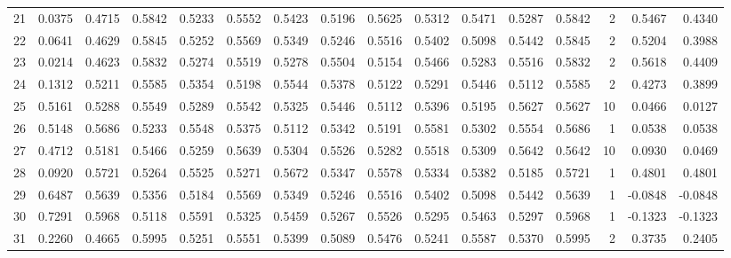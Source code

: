 \begin{tabular}{lrrrrrrrrrrrrrrr}
21  &      0.0375 &  0.4715 &  0.5842 &  0.5233 &  0.5552 &  0.5423 &  0.5196 &  0.5625 &  0.5312 &  0.5471 &   0.5287 &     0.5842 &      2 &                    0.5467 &                     0.4340 \\
22  &      0.0641 &  0.4629 &  0.5845 &  0.5252 &  0.5569 &  0.5349 &  0.5246 &  0.5516 &  0.5402 &  0.5098 &   0.5442 &     0.5845 &      2 &                    0.5204 &                     0.3988 \\
23  &      0.0214 &  0.4623 &  0.5832 &  0.5274 &  0.5519 &  0.5278 &  0.5504 &  0.5154 &  0.5466 &  0.5283 &   0.5516 &     0.5832 &      2 &                    0.5618 &                     0.4409 \\
24  &      0.1312 &  0.5211 &  0.5585 &  0.5354 &  0.5198 &  0.5544 &  0.5378 &  0.5122 &  0.5291 &  0.5446 &   0.5112 &     0.5585 &      2 &                    0.4273 &                     0.3899 \\
25  &      0.5161 &  0.5288 &  0.5549 &  0.5289 &  0.5542 &  0.5325 &  0.5446 &  0.5112 &  0.5396 &  0.5195 &   0.5627 &     0.5627 &     10 &                    0.0466 &                     0.0127 \\
26  &      0.5148 &  0.5686 &  0.5233 &  0.5548 &  0.5375 &  0.5112 &  0.5342 &  0.5191 &  0.5581 &  0.5302 &   0.5554 &     0.5686 &      1 &                    0.0538 &                     0.0538 \\
27  &      0.4712 &  0.5181 &  0.5466 &  0.5259 &  0.5639 &  0.5304 &  0.5526 &  0.5282 &  0.5518 &  0.5309 &   0.5642 &     0.5642 &     10 &                    0.0930 &                     0.0469 \\
28  &      0.0920 &  0.5721 &  0.5264 &  0.5525 &  0.5271 &  0.5672 &  0.5347 &  0.5578 &  0.5334 &  0.5382 &   0.5185 &     0.5721 &      1 &                    0.4801 &                     0.4801 \\
29  &      0.6487 &  0.5639 &  0.5356 &  0.5184 &  0.5569 &  0.5349 &  0.5246 &  0.5516 &  0.5402 &  0.5098 &   0.5442 &     0.5639 &      1 &                   -0.0848 &                    -0.0848 \\
30  &      0.7291 &  0.5968 &  0.5118 &  0.5591 &  0.5325 &  0.5459 &  0.5267 &  0.5526 &  0.5295 &  0.5463 &   0.5297 &     0.5968 &      1 &                   -0.1323 &                    -0.1323 \\
31  &      0.2260 &  0.4665 &  0.5995 &  0.5251 &  0.5551 &  0.5399 &  0.5089 &  0.5476 &  0.5241 &  0.5587 &   0.5370 &     0.5995 &      2 &                    0.3735 &                     0.2405 \\

\end{tabular}

